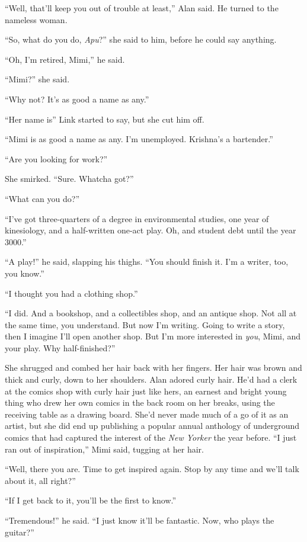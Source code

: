 ``Well, that'll keep you out of trouble at least,'' Alan said.  He
turned to the nameless woman.

``So, what do you do, \textit{Apu}?'' she said to him, before he could
say anything.

``Oh, I'm retired, Mimi,'' he said.

``Mimi?'' she said.

``Why not?  It's as good a name as any.''

``Her name is\dash{}'' Link started to say, but she cut him off.

``Mimi is as good a name as any.  I'm unemployed.  Krishna's a
bartender.''

``Are you looking for work?''

She smirked.  ``Sure.  Whatcha got?''

``What can you do?''

``I've got three-quarters of a degree in environmental studies, one
year of kinesiology, and a half-written one-act play.  Oh, and student
debt until the year 3000.''

``A play!'' he said, slapping his thighs.  ``You should finish it. 
I'm a writer, too, you know.''

``I thought you had a clothing shop.''

``I did.  And a bookshop, and a collectibles shop, and an antique
shop.  Not all at the same time, you understand.  But now I'm writing. 
Going to write a story, then I imagine I'll open another shop.  But
I'm more interested in \textit{you}, Mimi, and your play.  Why
half-finished?''

She shrugged and combed her hair back with her fingers.  Her hair was
brown and thick and curly, down to her shoulders.  Alan adored curly
hair.  He'd had a clerk at the comics shop with curly hair just like
hers, an earnest and bright young thing who drew her own comics in the
back room on her breaks, using the receiving table as a drawing board. 
She'd never made much of a go of it as an artist, but she did end up
publishing a popular annual anthology of underground comics that had
captured the interest of the \textit{New Yorker} the year before.  ``I
just ran out of inspiration,'' Mimi said, tugging at her hair.

``Well, there you are.  Time to get inspired again.  Stop by any time
and we'll talk about it, all right?''

``If I get back to it, you'll be the first to know.''

``Tremendous!'' he said.  ``I just know it'll be fantastic.  Now, who
plays the guitar?''

